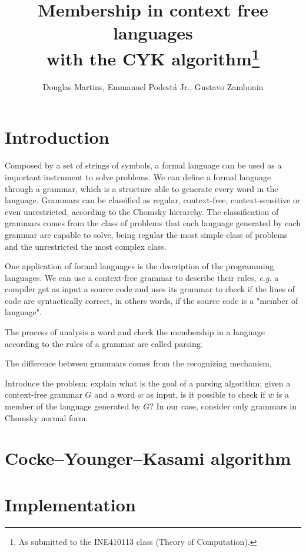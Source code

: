 \documentclass[12pt]{article}
\title{Membership in context free languages \\ with the CYK algorithm\footnote{
    As submitted to the INE410113 class (Theory of Computation).}}
\author{Douglas Martins\inst{1}, Emmanuel Podestá Jr.\inst{1}, Gustavo Zambonin\inst{1}}
\begin{document}
 

\maketitle

\section{Introduction}\label{sec:intro}
Composed by a set of strings of symbols, a formal language can be used as a important instrument to solve problems. We can define a formal language through a grammar, which is a structure able to generate every word in the language. Grammars can be classified as regular, context-free, context-sensitive or even unrestricted, according to the Chomsky hierarchy. The classification of grammars comes from the class of problems that each language generated by each grammar are capable to solve, being regular the most simple class of problems and the unrestricted the most complex class.

One application of formal languages is the description of the programming languages. We can use a context-free grammar to describe their rules, \emph{e.g.} a compiler get as input a source code and uses its grammar to check if the lines of code are syntactically correct, in others words, if the source code is a "member of language". 

The process of analysis a word and check the membership in a language according to the rules of a grammar are called parsing. 




The difference between grammars comes from the recognizing mechanism, 


Introduce the problem; explain what is the goal of a parsing algorithm; given a context-free grammar $G$ and a word $w$ as input, is it possible to check if $w$ is a member of the language generated by $G$? In our case, consider only grammars in Chomsky normal form.

\section{Cocke–Younger–Kasami algorithm}\label{sec:cyk}

\section{Implementation}\label{sec:imp}




\end{document}
